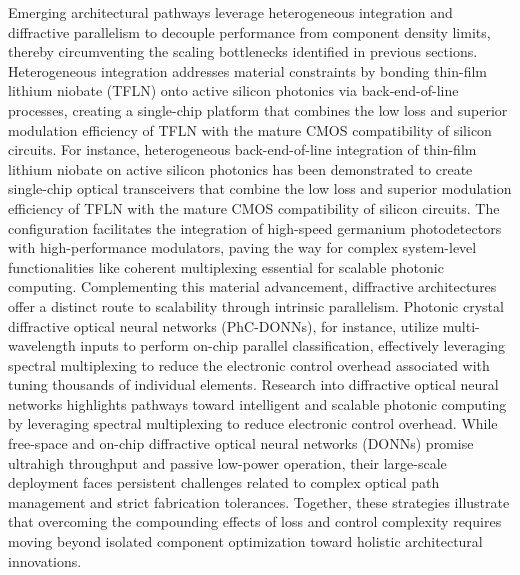 \documentclass[11pt]{article}
\begin{document}
Emerging architectural pathways leverage heterogeneous integration and diffractive parallelism to decouple performance from component density limits, thereby circumventing the scaling bottlenecks identified in previous sections. Heterogeneous integration addresses material constraints by bonding thin-film lithium niobate (TFLN) onto active silicon photonics via back-end-of-line processes, creating a single-chip platform that combines the low loss and superior modulation efficiency of TFLN with the mature CMOS compatibility of silicon circuits. For instance, heterogeneous back-end-of-line integration of thin-film lithium niobate on active silicon photonics has been demonstrated to create single-chip optical transceivers that combine the low loss and superior modulation efficiency of TFLN with the mature CMOS compatibility of silicon circuits. \citep{s2_9b444e84d20ae6e3d62d2d4df30268b5a53baad2_40af2cc9} The configuration facilitates the integration of high-speed germanium photodetectors with high-performance modulators, paving the way for complex system-level functionalities like coherent multiplexing essential for scalable photonic computing. Complementing this material advancement, diffractive architectures offer a distinct route to scalability through intrinsic parallelism. Photonic crystal diffractive optical neural networks (PhC-DONNs), for instance, utilize multi-wavelength inputs to perform on-chip parallel classification, effectively leveraging spectral multiplexing to reduce the electronic control overhead associated with tuning thousands of individual elements. Research into diffractive optical neural networks highlights pathways toward intelligent and scalable photonic computing by leveraging spectral multiplexing to reduce electronic control overhead. \citep{doi_10_1002_nap2_70098_8d5f2f8a} While free-space and on-chip diffractive optical neural networks (DONNs) promise ultrahigh throughput and passive low-power operation, their large-scale deployment faces persistent challenges related to complex optical path management and strict fabrication tolerances. Together, these strategies illustrate that overcoming the compounding effects of loss and control complexity requires moving beyond isolated component optimization toward holistic architectural innovations. \citep{s2_9b444e84d20ae6e3d62d2d4df30268b5a53baad2_40af2cc9} \citep{doi_10_1515_nanoph_2025_0168_86a0f7aa} \citep{doi_10_1002_nap2_70098_8d5f2f8a}
\end{document}
